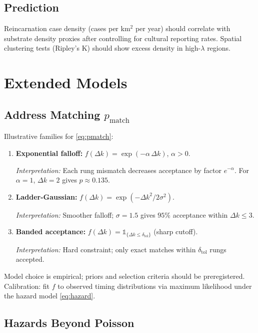 \documentclass[11pt,letterpaper]{article}
\theoremstyle{definition}
\theoremstyle{remark}
\begin{document}
\subsection{Prediction}

Reincarnation case density (cases per km\(^2\) per year) should correlate with substrate density proxies after controlling for cultural reporting rates. Spatial clustering tests (Ripley's K) should show excess density in high-\(\lambda\) regions.

\section{Extended Models}\label{app:extended}

\subsection{Address Matching \texorpdfstring{\(p_{\mathrm{match}}\)}{p\_match}}

Illustrative families for \eqref{eq:pmatch}: 

\begin{enumerate}
  \item \textbf{Exponential falloff:} \(f(\Delta k)=\exp(-\alpha\,\Delta k)\), \(\alpha>0\). 
  
  \emph{Interpretation:} Each rung mismatch decreases acceptance by factor \(e^{-\alpha}\). For \(\alpha=1\), \(\Delta k=2\) gives \(p\approx 0.135\).
  
  \item \textbf{Ladder-Gaussian:} \(f(\Delta k)=\exp(-\Delta k^{2}/2\sigma^{2})\). 
  
  \emph{Interpretation:} Smoother falloff; \(\sigma=1.5\) gives \(95\%\) acceptance within \(\Delta k\le 3\).
  
  \item \textbf{Banded acceptance:} \(f(\Delta k)=\mathbb{1}_{\{\Delta k\le \delta_{\text{tol}}\}}\) (sharp cutoff). 
  
  \emph{Interpretation:} Hard constraint; only exact matches within \(\delta_{\text{tol}}\) rungs accepted.
\end{enumerate}

Model choice is empirical; priors and selection criteria should be preregistered. Calibration: fit \(f\) to observed timing distributions via maximum likelihood under the hazard model \eqref{eq:hazard}.

\subsection{Hazards Beyond Poisson}
\end{document}
